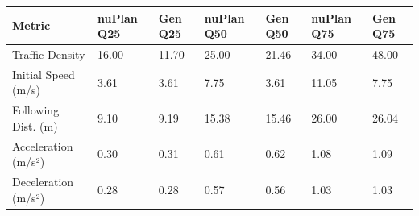 \begin{tabular}{lllllll}
\toprule
Metric & nuPlan Q25 & Gen Q25 & nuPlan Q50 & Gen Q50 & nuPlan Q75 & Gen Q75 \\
\midrule
Traffic Density & 16.00 & 11.70 & 25.00 & 21.46 & 34.00 & 48.00 \\
Initial Speed (m/s) & 3.61 & 3.61 & 7.75 & 3.61 & 11.05 & 7.75 \\
Following Dist. (m) & 9.10 & 9.19 & 15.38 & 15.46 & 26.00 & 26.04 \\
Acceleration (m/s²) & 0.30 & 0.31 & 0.61 & 0.62 & 1.08 & 1.09 \\
Deceleration (m/s²) & 0.28 & 0.28 & 0.57 & 0.56 & 1.03 & 1.03 \\
\bottomrule
\end{tabular}
